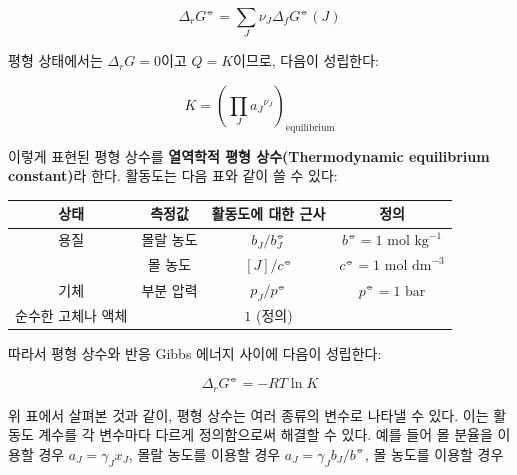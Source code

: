         \begin{obs}
        \begin{equation*}
            \Delta_r G^\circlehbar = \sum_J \nu_J \Delta_f G^\circlehbar \left(J\right)
        \end{equation*}
        \end{obs}
        평형 상태에서는 $\Delta_r G =0$이고 $Q=K$이므로, 다음이 성립한다:
        \begin{defn}[열역학적 평형 상수]
        \begin{equation*}
            K=\left(\prod_J {a_J}^{\nu_J}\right)_\mathrm{equilibrium}
        \end{equation*}
        \end{defn}
        이렇게 표현된 평형 상수를 \textbf{열역학적 평형 상수(Thermodynamic equilibrium constant)}라 한다. 활동도는 다음 표와 같이 쓸 수 있다:
        \begin{table}[H]
        \centering
            \begin{tabular}{ c c c c }
                \hline
                \rowcolor{lightgray}
                상태 & 측정값 & 활동도에 대한 근사 & 정의 \\
                \hline
                용질 & 몰랄 농도 & $b_J / b_J^\circlehbar$ & $b^\circlehbar = 1 \text{ mol kg}^{-1}$\\
                & 몰 농도 & $\left[J\right]/c^\circlehbar$ & $c^\circlehbar=1\text{ mol dm}^{-3}$\\
                기체 & 부분 압력 & $p_J/p^\circlehbar$ & $p^\circlehbar= 1\text{ bar}$ \\
                순수한 고체나 액체 & & $1$ (정의) & \\
                \hline
            \end{tabular}
        \end{table}
        따라서 평형 상수와 반응 Gibbs 에너지 사이에 다음이 성립한다:
        \begin{law}
        \begin{equation*}
            \Delta_r G^\circlehbar = -RT\ln{K}
        \end{equation*}
        \end{law}
        \par 위 표에서 살펴본 것과 같이, 평형 상수는 여러 종류의 변수로 나타낼 수 있다. 이는 활동도 계수를 각 변수마다 다르게 정의함으로써 해결할 수 있다. 예를 들어 
        몰 분율을 이용할 경우 $a_J = \gamma_J x_J$, 몰랄 농도를 이용할 경우 $a_J = \gamma_J b_J/b^\circlehbar$, 몰 농도를 이용할 경우 
